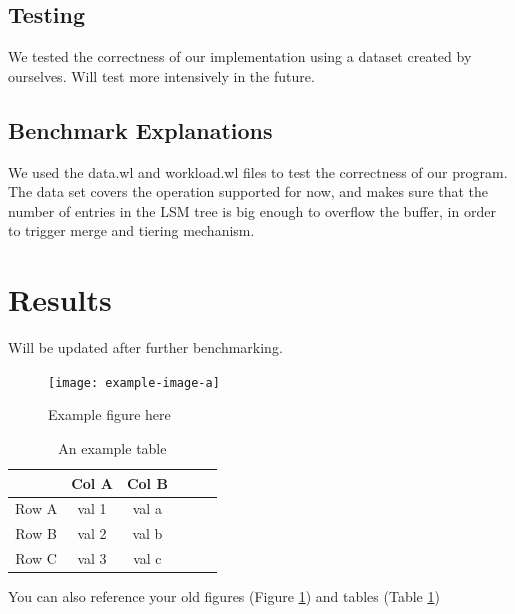 \documentclass[sigconf]{acmart}
\begin{document}
    \subsection{Testing}
    We tested the correctness of our implementation using a dataset created by ourselves. Will test more intensively in the future.

    \subsection{Benchmark Explanations}

    We used the data.wl and workload.wl files to test the correctness of our program. The data set covers the operation supported for now, and makes sure that the number of entries in the LSM tree is big enough to overflow the buffer, in order to trigger merge and tiering mechanism.


    \section{Results}
    Will be updated after further benchmarking.

    \begin{figure}[ht]
        \texttt{[image: example-image-a]}
        \caption{Example figure here}
        \label{fig:filler}
    \end{figure}

    \begin{table}[H]
        \caption{An example table}
        \label{tab:ex}
        \centering

        \begin{tabular}{c |c c c c c}
            \hline\hline
            & Col A & Col B \\
            \hline
            Row A & val 1 & val a \\
            Row B & val 2 & val b \\
            Row C & val 3 & val c \\
            \hline
        \end{tabular}
    \end{table}

    You can also reference your old figures (Figure \ref{fig:filler}) and tables
    (Table \ref{tab:ex})

\end{document}
